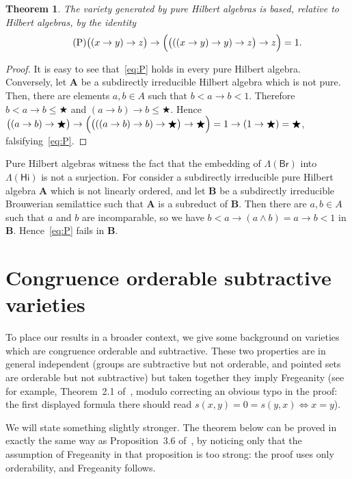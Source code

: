 \documentclass{amsart}
\newtheorem{theorem}{Theorem}[section]
\newcommand{\alg}[1]{\mathbf{#1}}
\newcommand{\var}[1]{\mathsf{#1}}
\def\ra{\rightarrow}
\def\op{\bigstar}
\begin{document}
\begin{theorem}\label{thm:pure-base}
The variety generated by pure Hilbert algebras is based, relative to Hilbert
algebras, by the identity
\begin{equation}\label{eq:P}\tag{P}
\bigl((x\ra y)\ra z\bigr)\ra \Bigl(\bigl(((x\ra y)\ra y)\ra z\bigr)\ra z\Bigr) = 1.
\end{equation}  
\end{theorem}

\begin{proof}
It is easy to see that~\eqref{eq:P} holds in every pure Hilbert
algebra. Conversely, let $\alg{A}$ be a subdirectly irreducible Hilbert algebra
which is not pure.
Then, there are elements $a, b\in A$ such
that $b < a\ra b < 1$. Therefore $b < a\ra b \leq \op$ and
$(a\ra b)\ra b \leq \op$. Hence
$\bigl((a\ra b)\ra \op \bigr)\ra \Bigl(\bigl(((a\ra b)\ra b)\ra \op \bigr)\ra
\op\Bigr) = 1 \ra  (1\ra \op ) = \op$, falsifying~\eqref{eq:P}.
\end{proof}

Pure Hilbert algebras witness the fact that the embedding
of $\Lambda(\var{Br})$ into $\Lambda(\var{Hi})$ is not a surjection.
For consider a subdirectly irreducible pure Hilbert algebra $\alg{A}$ which is not
linearly ordered, and let $\alg{B}$ be a subdirectly irreducible Brouwerian
semilattice such that $\alg{A}$ is a subreduct of $\alg{B}$.
Then there are $a,b\in A$ such that $a$ and $b$ are incomparable, so
we have $b< a\ra (a\wedge b) = a\ra b < 1$ in $\alg{B}$. Hence~\eqref{eq:P} fails in
$\alg{B}$.


\section{Congruence orderable subtractive varieties}\label{sec:orderable}

To place our results in a broader context, we give
some background on varieties which are congruence orderable 
and subtractive. These two properties are in general independent
(groups are subtractive but not orderable, and pointed sets are orderable but not
subtractive) but taken together they imply Fregeanity (see for example,
Theorem~2.1 of~\cite{Agl01}, modulo correcting an obvious typo in the proof: the
first displayed formula there should read $s(x,y) = 0 = s(y,x) \iff x = y$).

We will state something slightly stronger. The theorem below can be proved in
exactly the same way as Proposition~3.6 of~\cite{Slo12}, by noticing only that
the assumption of Fregeanity in that proposition is too strong: the proof uses only
orderability, and Fregeanity follows. 
\end{document}
